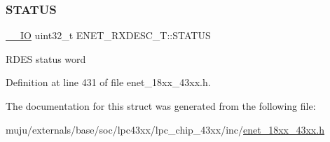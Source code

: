 \subsubsection{\texorpdfstring{S\+T\+A\+T\+US}{STATUS}}
{\footnotesize\ttfamily \hyperlink{core__sc300_8h_aec43007d9998a0a0e01faede4133d6be}{\+\_\+\+\_\+\+IO} uint32\+\_\+t E\+N\+E\+T\+\_\+\+R\+X\+D\+E\+S\+C\+\_\+\+T\+::\+S\+T\+A\+T\+US}

R\+D\+ES status word 

Definition at line 431 of file enet\+\_\+18xx\+\_\+43xx.\+h.



The documentation for this struct was generated from the following file\+:\begin{DoxyCompactItemize}
\item 
muju/externals/base/soc/lpc43xx/lpc\+\_\+chip\+\_\+43xx/inc/\hyperlink{enet__18xx__43xx_8h}{enet\+\_\+18xx\+\_\+43xx.\+h}\end{DoxyCompactItemize}
